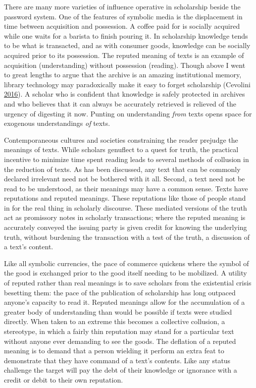 \documentclass[]{book}
\theoremstyle{definition}
\theoremstyle{definition}
\theoremstyle{definition}
\theoremstyle{remark}
\begin{document}
There are many more varieties of influence operative in scholarship
beside the password system. One of the features of symbolic media is the
displacement in time between acquisition and possession. A coffee paid
for is socially acquired while one waits for a barista to finish pouring
it. In scholarship knowledge tends to be what is transacted, and as with
consumer goods, knowledge can be socially acquired prior to its
possession. The reputed meaning of texts is an example of acquisition
(understanding) without possession (reading). Though above I went to
great lengths to argue that the archive is an amazing institutional
memory, library technology may paradoxically make it easy to forget
scholarship (Cevolini
\protect\hyperlink{ref-Cevolini2016Forgetting}{2016}). A scholar who is
confident that knowledge is safely protected in archives and who
believes that it can always be accurately retrieved is relieved of the
urgency of digesting it now. Punting on understanding \emph{from} texts
opens space for exogenous understandings \emph{of} texts.

Contemporaneous cultures and societies constraining the reader prejudge
the meanings of texts. While scholars genuflect to a quest for truth,
the practical incentive to minimize time spent reading leads to several
methods of collusion in the reduction of texts. As has been discussed,
any text that can be commonly declared irrelevant need not be bothered
with it all. Second, a text need not be read to be understood, as their
meanings may have a common sense. Texts have reputations and reputed
meanings. These reputations like those of people stand in for the real
thing in scholarly discourse. These mediated versions of the truth act
as promissory notes in scholarly transactions; where the reputed meaning
is accurately conveyed the issuing party is given credit for knowing the
underlying truth, without burdening the transaction with a test of the
truth, a discussion of a text's content.

Like all symbolic currencies, the pace of commerce quickens where the
symbol of the good is exchanged prior to the good itself needing to be
mobilized. A utility of reputed rather than real meanings is to save
scholars from the existential crisis besetting them: the pace of the
publication of scholarship has long outpaced anyone's capacity to read
it. Reputed meanings allow for the accumulation of a greater body of
understanding than would be possible if texts were studied directly.
When taken to an extreme this becomes a collective collusion, a
stereotype, in which a fairly thin reputation may stand for a particular
text without anyone ever demanding to see the goods. The deflation of a
reputed meaning is to demand that a person wielding it perform an extra
feat to demonstrate that they have command of a text's contents. Like
any status challenge the target will pay the debt of their knowledge or
ignorance with a credit or debit to their own reputation.
\end{document}
